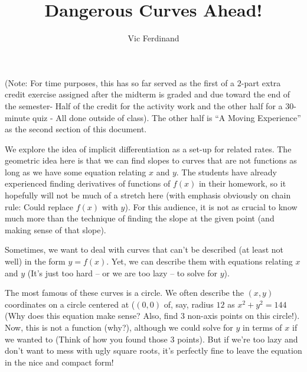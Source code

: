 \documentclass{ximera}
\author{Vic Ferdinand}
\title{Dangerous Curves Ahead!}
\begin{document}
\begin{abstract}
\end{abstract}
\maketitle

\begin{instructorIntro}

(Note: For time purposes, this has so far served as the first of a $2$-part extra credit exercise assigned after the midterm is graded and due toward the end of the semester- Half of the credit for the activity work and the other half for a $30$-minute quiz - All done outside of class).  The other half is ``A Moving Experience'' as the second section of this document.


We explore the idea of implicit differentiation as a set-up for related rates.  The geometric idea here is that we can find slopes to curves that are not functions as long as we have some equation relating $x$ and $y$.  The students have already experienced finding derivatives of functions of $f(x)$ in their homework, so it hopefully will not be much of a stretch here (with emphasis obviously on chain rule:  Could replace $f(x)$ with $y$).  For this audience, it is not as crucial to know much more than the technique of finding the slope at the given point (and making sense of that slope).
\end{instructorIntro}



Sometimes, we want to deal with curves that can't be described (at least not well) in the form  $y=f(x)$.  Yet, we can describe them with equations relating $x$ and $y$ (It's just too hard – or we are too lazy – to solve for $y$).

 The most famous of these curves is a circle.  We often describe the $(x, y)$ coordinates on a circle centered at ($(0, 0)$ of, say, radius $12$ as $x^2+y^2=144$ (Why does this equation make sense?  Also, find $3$ non-axis points on this circle!).  Now, this is not a function (why?), although we could solve for $y$ in terms of $x$ if we wanted to (Think of how you found those $3$ points).  But if we're too lazy and don't want to mess with ugly square roots, it's perfectly fine to leave the equation in the nice and compact  form!
 
\end{document}
